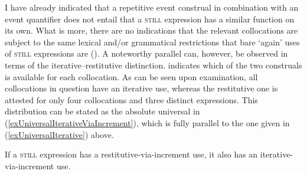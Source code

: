 I have already indicated that a repetitive event construal in combination with an event quantifier does not entail that a \textsc{still} expression has a similar function on its own. What is more, there are no indications that the relevant collocations are subject to the same lexical and/or grammatical restrictions that bare \lq again' uses of \textsc{still} expressions are (). A noteworthy parallel can, however, be observed in terms of the iterative–restitutive distinction.  indicates which of the two construals is available for each collocation. As can be seen upon examination, all collocations in question have an iterative use, whereas the restitutive one is attested for only four collocations and three distinct expressions. This distribution can be stated as the absolute universal in (\ref{exUniversalIterativeViaIncrement}), which is fully parallel to the one given in (\ref{exUniversalIterative}) above.

\begin{exe}
	\ex If a \textsc{still} expression has a restitutive-via-increment use, it also has an iterative-via-increment use.\label{exUniversalIterativeViaIncrement}
\end{exe}

